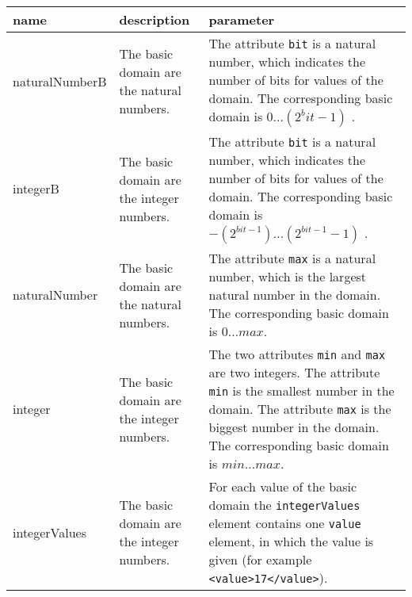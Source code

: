 \begin{center}
\begin{longtable}{|p{25mm}|p{25mm}|p{75mm}|}\hline
	name & description & parameter \\\hline\endhead
	naturalNumberB & The basic domain are the natural numbers. & The attribute \verb|bit| is a natural number, which indicates the number of bits for values of the domain. The corresponding basic domain is $0 \ldots (2^bit-1)$ . \\\hline
	integerB & The basic domain are the integer numbers. & The attribute \verb|bit| is a natural number, which indicates the number of bits for values of the domain. The corresponding basic domain is $-(2^{bit-1}) \ldots (2^{bit-1}-1)$ . \\\hline
	naturalNumber & The basic domain are the natural numbers. & The attribute \verb|max| is a natural number, which is the largest natural number in the domain. The corresponding basic domain is $0 \ldots max$.\\\hline
	integer & The basic domain are the integer numbers. & The two attributes \verb|min| and \verb|max| are two integers. The attribute \verb|min| is the smallest number in the domain. The attribute \verb|max| is the biggest number in the domain. The corresponding basic domain is $min \ldots max$. \\\hline
	integerValues & The basic domain are the integer numbers. & For each value of the basic domain the \verb|integerValues| element contains one \verb|value| element, in which the value is given (for example  \verb|<value>17</value>|).\\\hline



\end{longtable}
\end{center}

